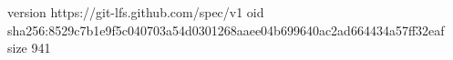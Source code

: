 version https://git-lfs.github.com/spec/v1
oid sha256:8529c7b1e9f5c040703a54d0301268aaee04b699640ac2ad664434a57ff32eaf
size 941
